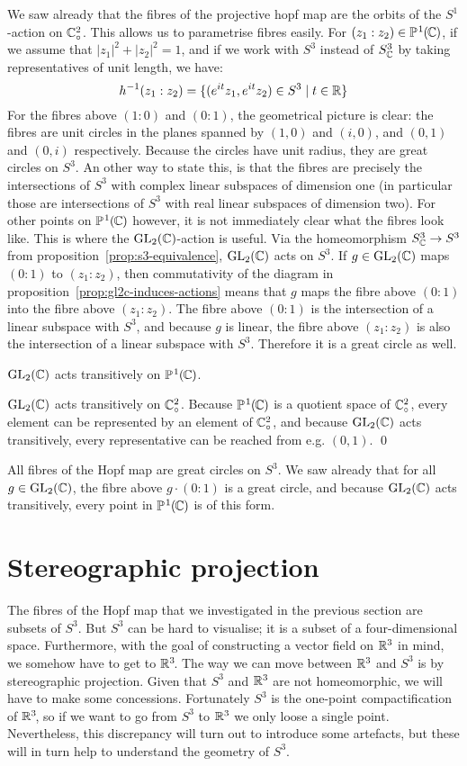 We saw already that the fibres of the projective hopf map are the
orbits of the $S^1$-action on $\mathbb{C}^2_\circ$.
This allows us to parametrise fibres easily.
For $(z_1 : z_2) \in \mathbb{P}^{\hspace{0.8pt}1}\hspace{-0.3pt}(\hspace{-0.7pt}\mathbb{C}\hspace{-0.3pt})$,
if we assume that $|z_1|^2 + |z_2|^2 = 1$,
and if we work with $S^3$ instead of $S^3_{\mathbb{C}}$ by taking representatives of unit length,
we have:
\[ h^{-1}(z_1 : z_2) = \{  (e^{it} z_1, e^{it} z_2) \in S^3 \mid t \in \mathbb{R}  \} \]
For the fibres above $(1 : 0)$ and $(0 : 1)$,
the geometrical picture is clear:
the fibres are unit circles in the planes spanned by $(1, 0)$ and $(i, 0)$,
and $(0, 1)$ and $(0, i)$ respectively.
Because the circles have unit radius,
they are great circles on $S^3\!$.
An other way to state this,
is that the fibres are precisely the intersections of $S^3$ with complex linear subspaces of dimension one
(in particular those are intersections of $S^3$ with real linear subspaces of dimension two).
For other points on $\mathbb{P}^{\hspace{0.8pt}1}\hspace{-0.3pt}(\hspace{-0.7pt}\mathbb{C}\hspace{-0.3pt})$ however,
it is not immediately clear what the fibres look like.
This is where the $\operatorname{GL}_2(\mathbb{C})$-action is useful.
Via the homeomorphism $S^3_{\mathbb{C}} \to S^3$ from proposition~\ref{prop:s3-equivalence},
$\operatorname{GL}_2(\mathbb{C})$ acts on $S^3\!$.
If $g \in \operatorname{GL}_2(\mathbb{C})$ maps $(0 : 1)$ to $(z_1 : z_2)$,
then commutativity of the diagram in proposition~\ref{prop:gl2c-induces-actions}
means that $g$ maps the fibre above $(0 : 1)$ into the fibre above $(z_1 : z_2)$.
The fibre above $(0 : 1)$ is the intersection of a linear subspace
with $S^3\!$,
and because $g$ is linear,
the fibre above $(z_1 : z_2)$ is also the intersection of a linear subspace
with $S^3\!$.
Therefore it is a great circle as well.

$\operatorname{GL}_2(\mathbb{C})$ acts transitively on $\mathbb{P}^{\hspace{0.8pt}1}\hspace{-0.3pt}(\hspace{-0.7pt}\mathbb{C}\hspace{-0.3pt})$.

\proof
$\operatorname{GL}_2(\mathbb{C})$ acts transitively on $\mathbb{C}^2_\circ$.
Because $\mathbb{P}^{\hspace{0.8pt}1}\hspace{-0.3pt}(\hspace{-0.7pt}\mathbb{C}\hspace{-0.3pt})$ is a quotient space of $\mathbb{C}^2_\circ$,
every element can be represented by an element of $\mathbb{C}^2_\circ$,
and because $\operatorname{GL}_2(\mathbb{C})$ acts transitively,
every representative can be reached from e.g. $(0, 1)$.
\qed

\corollary
All fibres of the Hopf map are great circles on $S^3\!$.
We saw already that for all $g \in \operatorname{GL}_2(\mathbb{C})$,
the fibre above $g \cdot (0 : 1)$ is a great circle,
and because $\operatorname{GL}_2(\mathbb{C})$ acts transitively,
every point in $\mathbb{P}^{\hspace{0.8pt}1}\hspace{-0.3pt}(\hspace{-0.7pt}\mathbb{C}\hspace{-0.3pt})$ is of this form.

\section{Stereographic projection}
The fibres of the Hopf map that we investigated in the previous section
are subsets of $S^3\!$.
But $S^3$ can be hard to visualise;
it is a subset of a four-dimensional space.
Furthermore, with the goal of constructing a vector field on $\mathbb{R}^3$ in mind,
we somehow have to get to $\mathbb{R}^3\!$.
The way we can move between $\mathbb{R}^3$ and $S^3$ is by stereographic projection.
Given that $S^3$ and $\mathbb{R}^3$ are not homeomorphic,
we will have to make some concessions.
Fortunately $S^3$ is the one-point compactification of $\mathbb{R}^3\!$,
so if we want to go from $S^3$ to $\mathbb{R}^3$
we only loose a single point.
Nevertheless, this discrepancy will turn out to introduce some artefacts,
but these will in turn help to understand the geometry of $S^3\!$.

